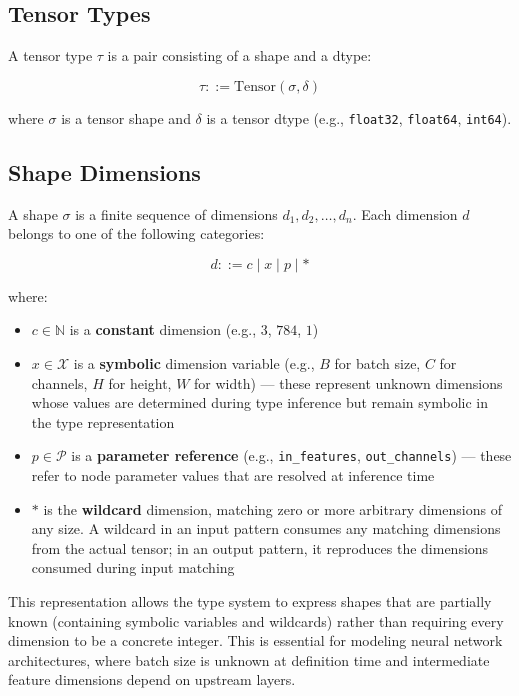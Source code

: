 \documentclass[11pt,a4paper]{article}
\begin{document}
\subsection{Tensor Types}

A tensor type $\tau$ is a pair consisting of a shape and a dtype:

\[
	\tau ::= \text{Tensor}(\sigma, \delta)
\]

where $\sigma$ is a tensor shape and $\delta$ is a tensor dtype (e.g., \texttt{float32}, \texttt{float64}, \texttt{int64}).

\subsection{Shape Dimensions}

A shape $\sigma$ is a finite sequence of dimensions $d_1, d_2, \ldots, d_n$. Each dimension $d$ belongs to one of the following categories:

\[
	d ::= c \mid x \mid p \mid *
\]

where:
\begin{itemize}
	\item $c \in \mathbb{N}$ is a \textbf{constant} dimension (e.g., $3$, $784$, $1$)
	\item $x \in \mathcal{X}$ is a \textbf{symbolic} dimension variable (e.g., $B$ for batch size, $C$ for channels, $H$ for height, $W$ for width) --- these represent unknown dimensions whose values are determined during type inference but remain symbolic in the type representation
	\item $p \in \mathcal{P}$ is a \textbf{parameter reference} (e.g., \texttt{in\_features}, \texttt{out\_channels}) --- these refer to node parameter values that are resolved at inference time
	\item $*$ is the \textbf{wildcard} dimension, matching zero or more arbitrary dimensions of any size. A wildcard in an input pattern consumes any matching dimensions from the actual tensor; in an output pattern, it reproduces the dimensions consumed during input matching
\end{itemize}

This representation allows the type system to express shapes that are partially known (containing symbolic variables and wildcards) rather than requiring every dimension to be a concrete integer. This is essential for modeling neural network architectures, where batch size is unknown at definition time and intermediate feature dimensions depend on upstream layers.
\end{document}
